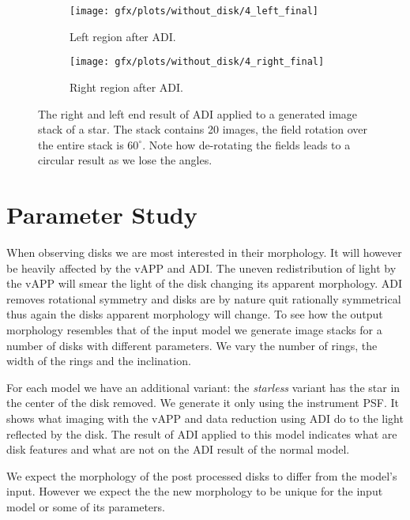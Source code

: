 \begin{figure}[h!]
      \begin{subfigure}[b]{0.5\textwidth}
        \texttt{[image: gfx/plots/without\_disk/4\_left\_final]}
        \caption{Left region after \ac{ADI}.}
      \end{subfigure}%
      \begin{subfigure}[b]{0.5\textwidth}
        \texttt{[image: gfx/plots/without\_disk/4\_right\_final]}
        \caption{Right region after \ac{ADI}.}
      \end{subfigure}      

  \caption{The right and left end result of \ac{ADI} applied to a generated image stack of a star. The stack contains 20 images, the field rotation over the entire stack is $60^{\circ}$. Note how de-rotating the fields leads to a circular result as we lose the angles.}
  \label{fig:adi_star_only}
\end{figure}

\section{Parameter Study}
\label{sec:paramstudy}
When observing disks we are most interested in their morphology. It will however be heavily affected by the \ac{vAPP} and \ac{ADI}. The uneven redistribution of light by the \ac{vAPP} will smear the light of the disk changing its apparent morphology. \ac{ADI} removes rotational symmetry and disks are by nature quit rationally symmetrical thus again the disks apparent morphology will change. To see how the output morphology resembles that of the input model we generate image stacks for a number of disks with different parameters. We vary the number of rings, the width of the rings and the inclination.

For each model we have an additional variant: the \textit{starless} variant has the star in the center of the disk removed. We generate it only using the instrument \ac{PSF}. It shows what imaging with the \ac{vAPP} and data reduction using \ac{ADI} do to the light reflected by the disk. The result of \ac{ADI} applied to this model indicates what are disk features and what are not on the \ac{ADI} result of the normal model.

We expect the morphology of the post processed disks to differ from the model's input. However we expect the the new morphology to be unique for the input model or some of its parameters.


